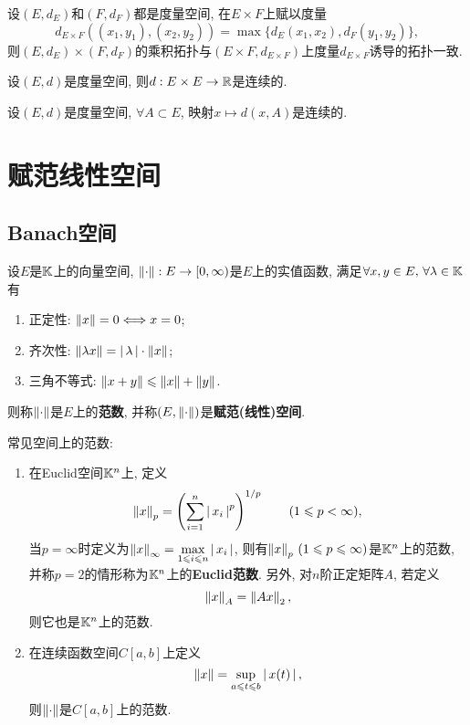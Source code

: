 	\begin{Remark}
	设$ (E,d_E) $和$ (F,d_F) $都是度量空间, 在$ E\times F $上赋以度量
	\[
	d_{E\times F}\left((x_1,y_1),(x_2,y_2)\right)=\max\{ d_E(x_1,x_2), d_F(y_1,y_2) \},
	\]
	则$ (E,d_E) \times (F,d_F) $的乘积拓扑与$ (E\times F, d_{E\times F}) $上度量$ d_{E\times F} $诱导的拓扑一致.
	\end{Remark}
	
	\begin{Proposition}
	设$ (E,d) $是度量空间, 则$ d : E\times E\to\mathbb{R} $是连续的.
	\end{Proposition}
	\begin{Corollary}
	设$ (E,d) $是度量空间, $ \forall A\subset E $, 映射$ x\mapsto d(x,A) $是连续的.
	\end{Corollary}
	
\section{赋范线性空间}
	
	\subsection{Banach空间}
	
	\begin{Definition}[赋范空间]\label{def:赋范空间}
	设$ E $是$ \mathbb{K} $上的向量空间, $ \left\| \cdot \right\| : E\to[0,\infty) $是$ E $上的实值函数, 满足$ \forall x,y\in E,\,\forall\lambda\in\mathbb{K} $有
	
	\begin{enumerate}[(1)]
	\item 正定性: $ \left\| x \right\|=0\Longleftrightarrow x=0 $;
	
	\item 齐次性: $ \left\| \lambda x \right\|=\left| \,\lambda\, \right| \cdot\left\| x \right\| $;
	
	\item 三角不等式: $ \left\| x+y \right\|\leqslant\left\| x \right\|+\left\| y \right\| $.
	\end{enumerate} 
	则称$ \left\| \cdot \right\| $是$ E $上的\textbf{范数}, 并称$ (E,\left\| \cdot \right\|) $是\textbf{赋范(线性)空间}.
	\end{Definition}
	
	\begin{Example}
	常见空间上的范数:
	
	\begin{enumerate}[(1)]
	\item 在Euclid空间$ \mathbb{K}^n $上, 定义
		\[
		\left\| x \right\|_p=\left(\sum_{i=1}^n\left| \,x_i\, \right| ^p\right)^{1/p}\qquad(1\leqslant p<\infty),
		\]
		当$ p=\infty $时定义为$ \left\| x \right\|_\infty=\max\limits_{1\leqslant i\leqslant n}\left| \,x_i\, \right|  $, 则有$ \left\| x \right\|_p\,(1\leqslant p\leqslant\infty) $是$ \mathbb{K}^n $上的范数, 并称$ p=2 $的情形称为$ \mathbb{K}^n $上的\textbf{Euclid范数}. 另外, 对$ n $阶正定矩阵$ A $, 若定义
		\[
		\left\| x \right\|_A=\left\| Ax \right\|_2,
		\]
		则它也是$ \mathbb{K}^n $上的范数.
	
	\item 在连续函数空间$ C[a,b] $上定义
	\[
	\left\| x \right\|=\sup_{a\leqslant t\leqslant b}\left| \,x(t)\, \right| ,
	\]
	则$ \left\| \cdot \right\| $是$ C[a,b] $上的范数.
	\end{enumerate}
	
	\end{Example}
	
